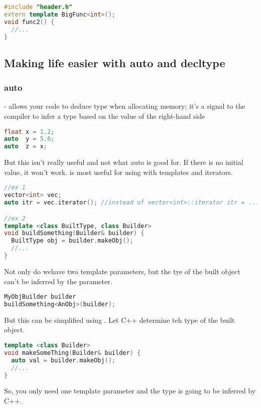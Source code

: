 \begin{lstlisting}[language=C++]
#include "header.h"
extern template BigFunc<int>();
void func2() {
  //...
}
\end{lstlisting}


\subsection{Making life easier with auto and decltype}

\subsubsection{auto}

 - allows your code to deduce type when allocating memory; it's a signal to the compiler to infer a type based on the value of the right-hand side

\begin{lstlisting}[language=C++]
float x = 1.2;
auto  y = 5.6;
auto  z = x;
\end{lstlisting}

But this isn't really useful and not what auto is good for. If there is no initial value, it won't work.  is most useful for using with templates and iterators.

\begin{lstlisting}[language=C++]
//ex 1
vector<int> vec;
auto itr = vec.iterator(); //instead of vector<int>::iterator itr = ...

//ex 2
template <class BuiltType, class Builder>
void buildSomething(Builder& builder) {
  BuiltType obj = builder.makeObj();
  //...
}
\end{lstlisting}

Not only do wehave two template parameters, but the tye of the built object can't be inferred by the parameter.

\begin{lstlisting}[language=C++]
MyObjBuilder builder
buildSomething<AnObj>(builder);
\end{lstlisting}

But this can be simplified using . Let C++ determine teh type of the built object.

\begin{lstlisting}[language=C++]
template <class Builder>
void makeSomeThing(Builder& builder) {
  auto val = builder.makeObj();
  //...
}
\end{lstlisting}

So, you only need one template parameter and the type is going to be inferred by C++.

